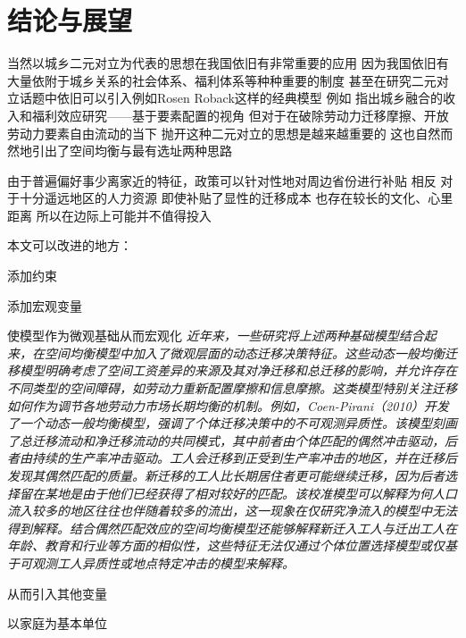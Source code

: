 \documentclass[
  a4paper,
  zihao=-4,
  fontset=mac,
  AutoFakeBold,
  AutoFakeSlant,
  oneside]{ctexbook}
\begin{document}
\chapter{结论与展望}

当然以城乡二元对立为代表的思想在我国依旧有非常重要的应用 因为我国依旧有大量依附于城乡关系的社会体系、福利体系等种种重要的制度
甚至在研究二元对立话题中依旧可以引入例如Rosen Roback这样的经典模型
例如 
\textcite{GuoDongMeiChengXiangRongHeDeShouRuHeFuLiXiaoYingYanJiuJiYuYaoSuPeiZhiDeShiJiao2023}指出城乡融合的收入和福利效应研究——基于要素配置的视角
但对于在破除劳动力迁移摩擦、开放劳动力要素自由流动的当下
抛开这种二元对立的思想是越来越重要的
这也自然而然地引出了空间均衡与最有选址两种思路



由于普遍偏好事少离家近的特征，政策可以针对性地对周边省份进行补贴
相反 对于十分遥远地区的人力资源 即使补贴了显性的迁移成本 也存在较长的文化、心里距离 所以在边际上可能并不值得投入



本文可以改进的地方：

添加约束

添加宏观变量

使模型作为微观基础从而宏观化
\textit{近年来，一些研究将上述两种基础模型结合起来，在空间均衡模型中加入了微观层面的动态迁移决策特征。这些动态一般均衡迁移模型明确考虑了空间工资差异的来源及其对净迁移和总迁移的影响，并允许存在不同类型的空间障碍，如劳动力重新配置摩擦和信息摩擦。这类模型特别关注迁移如何作为调节各地劳动力市场长期均衡的机制。例如，Coen-Pirani（2010）开发了一个动态一般均衡模型，强调了个体迁移决策中的不可观测异质性。该模型刻画了总迁移流动和净迁移流动的共同模式，其中前者由个体匹配的偶然冲击驱动，后者由持续的生产率冲击驱动。工人会迁移到正受到生产率冲击的地区，并在迁移后发现其偶然匹配的质量。新迁移的工人比长期居住者更可能继续迁移，因为后者选择留在某地是由于他们已经获得了相对较好的匹配。该校准模型可以解释为何人口流入较多的地区往往也伴随着较多的流出，这一现象在仅研究净流入的模型中无法得到解释。结合偶然匹配效应的空间均衡模型还能够解释新迁入工人与迁出工人在年龄、教育和行业等方面的相似性，这些特征无法仅通过个体位置选择模型或仅基于可观测工人异质性或地点特定冲击的模型来解释。}

从而引入其他变量

以家庭为基本单位


\newpage
\appendix
\end{document}
